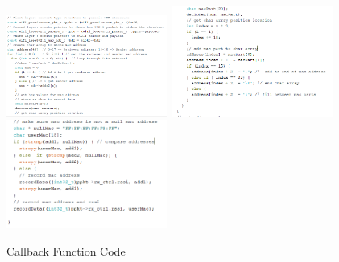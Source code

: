 \documentclass{report}
\begin{document}
\begin{figure}[h!]
    \centering
    \includegraphics[width=200]{callback_1.PNG} 
    \includegraphics[width=200]{callback_2.PNG}
    \includegraphics[width=200]{callback_4.PNG}
    \caption{Callback Function Code}
    \label{fig:callbackFun}
\end{figure} \\
\end{document}
